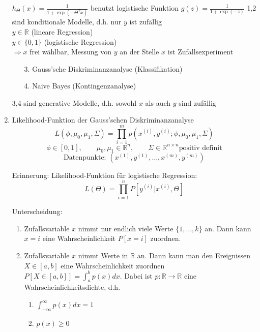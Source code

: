 \begin{enumerate}[(1)]
$h_\Theta(x) = \frac{1}{1+\exp(-\Theta^T x)}$ benutzt logistische Funktion $g(z) = \frac{1}{1+\exp(-z)}$
1,2 sind konditionale Modelle, d.h. nur $y$ ist zufällig\\
$y \in \mathbb{R}$ (lineare Regression)\\
$y \in \{0,1\}$ (logistische Regression)\\
$\Rightarrow x$ frei wählbar, Messung von $y$ an der Stelle $x$ ist Zufallsexperiment

\begin{enumerate}
\item[3.] Gauss'sche Diskriminanzanalyse (Klassifikation)
\item[4.] Naive Bayes (Kontingenzanalyse)
\end{enumerate}

3,4 sind generative Modelle, d.h. sowohl $x$ als auch $y$ sind zufällig
\item Likelihood-Funktion der Gauss'schen Diskriminanzanalyse
\[L(\phi,\mu_0, \mu_1, \Sigma) = \prod^m_{i=1} p(x^{(i)},y^{(i)};\phi,\mu_0, \mu_1, \Sigma)\]
\[\phi \in [0,1], \quad\quad \mu_0, \mu_1 \in \mathbb{R}^n, \quad\quad \Sigma \in \mathbb{R}^{n \times n} \text{positiv definit}\]
\[\text{Datenpunkte: } (x^{(1)},y^{(1)}, \dots , x^{(m)},y^{(m)})\]

\begin{framed}
Erinnerung: Likelihood-Funktion für logistische Regression:
\[L(\Theta) = \prod^n_{i=1} P[y^{(i)} | x^{(i)}, \Theta]\]
\end{framed}

\begin{framed}
Unterscheidung:
\begin{enumerate}[1.]
\item Zufallsvariable $x$ nimmt nur endlich viele Werte $\{1, \dots , k\}$ an. Dann kann $x = i$ eine Wahrscheinlichkeit $P[x = i]$ zuordnen.
\item Zufallsvariable $x$ nimmt Werte in $\mathbb{R}$ an. Dann kann man den Ereignissen $X \in [a,b]$ eine Wahrscheinlichkeit zuordnen $P[X \in [a,b]] = \int^b_a p(x) dx$. Dabei ist $p:\mathbb{R} \rightarrow \mathbb{R}$ eine Wahrscheinlichkeitsdichte, d.h.

\begin{enumerate}[(1.)]
\item $\int^\infty_{- \infty} p(x) dx = 1$
\item $p(x) \geq 0$
\end{enumerate}
\end{enumerate}
\end{framed}


\end{enumerate}
